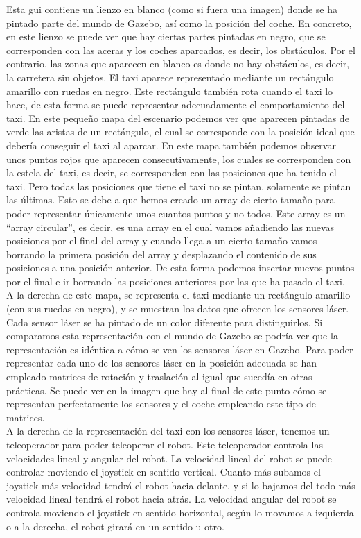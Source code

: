 Esta \acrshort{gui} contiene un lienzo en blanco (como si fuera una imagen) donde se ha pintado parte del mundo de Gazebo, así como la posición del coche. En concreto, en este lienzo se puede ver que hay ciertas partes pintadas en negro, que se corresponden con las aceras y los coches aparcados, es decir, los obstáculos. Por el contrario, las zonas que aparecen en blanco es donde no hay obstáculos, es decir, la carretera sin objetos. El taxi aparece representado mediante un rectángulo amarillo con ruedas en negro. Este rectángulo también rota cuando el taxi lo hace, de esta forma se puede representar adecuadamente el comportamiento del taxi. En este pequeño mapa del escenario podemos ver que aparecen pintadas de verde las aristas de un rectángulo, el cual se corresponde con la posición ideal que debería conseguir el taxi al aparcar. En este mapa también podemos observar unos puntos rojos que aparecen consecutivamente, los cuales se corresponden con la estela del taxi, es decir, se corresponden con las posiciones que ha tenido el taxi. Pero todas las posiciones que tiene el taxi no se pintan, solamente se pintan las últimas. Esto se debe a que hemos creado un array de cierto tamaño para poder representar únicamente unos cuantos puntos y no todos. Este array es un ``array circular'', es decir, es una array en el cual vamos añadiendo las nuevas posiciones por el final del array y cuando llega a un cierto tamaño vamos borrando la primera posición del array y desplazando el contenido de sus posiciones a una posición anterior. De esta forma podemos insertar nuevos puntos por el final e ir borrando las posiciones anteriores por las que ha pasado el taxi.\\

A la derecha de este mapa, se representa el taxi mediante un rectángulo amarillo (con sus ruedas en negro), y se muestran los datos que ofrecen los sensores láser. Cada sensor láser se ha pintado de un color diferente para distinguirlos. Si comparamos esta representación con el mundo de Gazebo se podría ver que la representación es idéntica a cómo se ven los sensores láser en Gazebo. Para poder representar cada uno de los sensores láser en la posición adecuada se han empleado matrices de rotación y traslación al igual que sucedía en otras prácticas. Se puede ver en la imagen que hay al final de este punto cómo se representan perfectamente los sensores y el coche empleando este tipo de matrices. \\

A la derecha de la representación del taxi con los sensores láser, tenemos un teleoperador para poder teleoperar el robot. Este teleoperador controla las velocidades lineal y angular del robot. La velocidad lineal del robot se puede controlar moviendo el joystick en sentido vertical. Cuanto más subamos el joystick más velocidad tendrá el robot hacia delante, y si lo bajamos del todo más velocidad lineal tendrá el robot hacia atrás. La velocidad angular del robot se controla moviendo el joystick en sentido horizontal, según lo movamos a izquierda o a la derecha, el robot girará en un sentido u otro.\\

